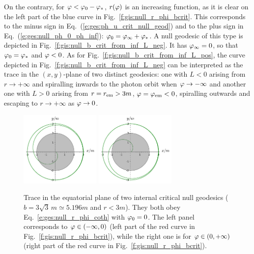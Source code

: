 On the contrary, for $\varphi < \varphi_0 - \varphi_*$,
$r(\varphi)$ is an increasing
function, as it is clear on the left part of the blue curve in Fig.~\ref{f:gis:null_r_phi_bcrit}.
This corresponds to the
minus sign in Eq.~(\ref{e:ges:ph_u_crit_null_geod}) and to the plus sign in
Eq.~(\ref{e:ges:null_ph_0_ph_inf}): $\varphi_0 = \varphi_\infty + \varphi_*$.
A null geodesic of this type is depicted in Fig.~\ref{f:gis:null_b_crit_from_inf_L_neg}.
It has $\varphi_\infty = 0$, so that $\varphi_0 = \varphi_*$ and $\varphi < 0$.
As for Fig.~\ref{f:gis:null_b_crit_from_inf_L_pos}, the curve depicted in
Fig.~\ref{f:gis:null_b_crit_from_inf_L_neg} can be interpreted as the trace
in the $(x,y)$-plane of two distinct
geodesics: one with $L<0$ arising from $r\to + \infty$
and spiralling inwards to the photon orbit when $\varphi\to -\infty$
and another one with $L>0$
arising from $r=r_{\rm em} > 3 m$, $\varphi=\varphi_{\rm em}<0$,
spiralling outwards and escaping to $r\to +\infty$ as $\varphi\to 0$.

\begin{figure}
\centerline{
\includegraphics[width=0.35\textwidth]{ges_null_b_crit_intern_1.pdf}\qquad
\includegraphics[width=0.35\textwidth]{ges_null_b_crit_intern_2.pdf}
}
\caption[]{\label{f:gis:null_b_crit_intern} \footnotesize
Trace in the equatorial plane of two internal critical null geodesics ($b = 3\sqrt{3} \, m \simeq 5.196 m$ and
$r<3m$). They both obey Eq.~\eqref{e:ges:null_r_phi_coth} with $\varphi_0 = 0$.
The left panel corresponds to $\varphi\in (-\infty, 0)$ (left part of the red curve
in Fig.~\ref{f:gis:null_r_phi_bcrit}), while the right one is
for $\varphi\in (0, +\infty)$ (right part of the red curve
in Fig.~\ref{f:gis:null_r_phi_bcrit}).}
\end{figure}


